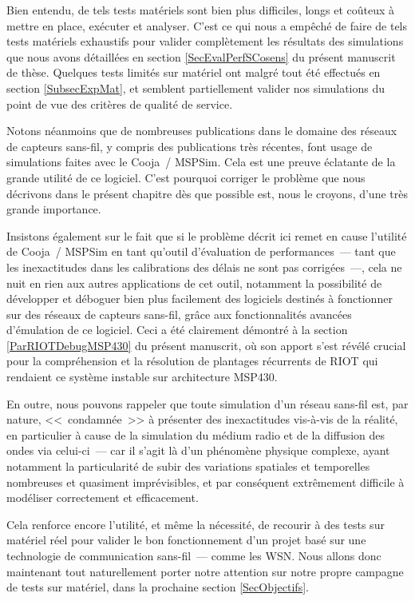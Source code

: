 Bien entendu, de tels tests matériels sont bien plus difficiles, longs
et coûteux à mettre en place, exécuter et analyser. C'est ce qui nous
a empêché de faire de tels tests matériels exhaustifs pour valider
complètement les résultats des simulations que nous avons détaillées
en section \vref{SecEvalPerfSCosens} du présent manuscrit de thèse.
Quelques tests limités sur matériel ont malgré tout été effectués
en section \vref{SubsecExpMat}, et semblent partiellement valider
nos simulations du point de vue des critères de qualité de service.

\bigskip

Notons néanmoins que de nombreuses publications dans le domaine des
réseaux de capteurs sans-fil, y compris des publications très récentes,
font usage de simulations faites avec le  Cooja~/ MSPSim.
Cela est une preuve éclatante de la grande utilité de ce logiciel.
C'est pourquoi corriger le problème que nous décrivons dans le présent
chapitre dès que possible est, nous le croyons, d'une très grande importance.

\medskip

Insistons également sur le fait que si le problème décrit ici remet
en cause l'utilité de Cooja~/ MSPSim en tant qu'outil d'évaluation de
performances~--- tant que les inexactitudes dans les calibrations des délais
ne sont pas corrigées~---, cela ne nuit en rien aux autres applications de
cet outil, notamment la possibilité de développer et déboguer bien plus
facilement des logiciels destinés à fonctionner sur des réseaux de capteurs
sans-fil, grâce aux fonctionnalités avancées d'émulation de ce
 logiciel. Ceci a été clairement démontré à la section
\vref{ParRIOTDebugMSP430} du présent manuscrit, où son apport s'est révélé
crucial pour la compréhension et la résolution de plantages récurrents de
RIOT qui rendaient ce système instable sur architecture MSP430.

\bigskip

En outre, nous pouvons rappeler que toute simulation d'un réseau sans-fil
est, par nature, <<~condamnée~>> à présenter des inexactitudes vis-à-vis
de la réalité, en particulier à cause de la simulation du médium radio et
de la diffusion des ondes via celui-ci~--- car il s'agit là d'un phénomène
physique complexe, ayant notamment la particularité de subir des variations
spatiales et temporelles nombreuses et quasiment imprévisibles, et par
conséquent extrêmement difficile à modéliser correctement et efficacement.

Cela renforce encore l'utilité, et même la nécessité, de recourir à des
tests sur matériel réel pour valider le bon fonctionnement d'un projet
basé sur une technologie de communication sans-fil~--- comme les WSN.
Nous allons donc maintenant tout naturellement porter notre attention sur
notre propre campagne de tests sur matériel, dans la prochaine section
\ref{SecObjectifs}.

